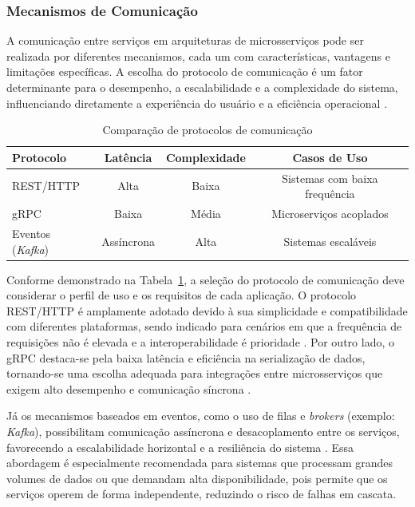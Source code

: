 \subsubsection{Mecanismos de Comunicação}
A comunicação entre serviços em arquiteturas de microsserviços pode ser realizada por diferentes mecanismos, cada um com características, vantagens e limitações específicas. A escolha do protocolo de comunicação é um fator determinante para o desempenho, a escalabilidade e a complexidade do sistema, influenciando diretamente a experiência do usuário e a eficiência operacional \cite{niswar2023performance, maso2024comparativo}.

\setcounter{table}{0}
\begin{table}[H]
\centering
\caption{Comparação de protocolos de comunicação}
\begin{tabular}{|l|c|c|c|}
\hline
Protocolo & Latência & Complexidade & Casos de Uso \\
\hline
REST/HTTP & Alta & Baixa & Sistemas com baixa frequência \\
gRPC & Baixa & Média & Microserviços acoplados \\
Eventos (\textit{Kafka}) & Assíncrona & Alta & Sistemas escaláveis \\
\hline
\end{tabular}
\label{tab:protocolos}
\end{table}

Conforme demonstrado na Tabela~\ref{tab:protocolos}, a seleção do protocolo de comunicação deve considerar o perfil de uso e os requisitos de cada aplicação. O protocolo REST/HTTP é amplamente adotado devido à sua simplicidade e compatibilidade com diferentes plataformas, sendo indicado para cenários em que a frequência de requisições não é elevada e a interoperabilidade é prioridade \cite{fielding2000rest, aws:1}. Por outro lado, o gRPC destaca-se pela baixa latência e eficiência na serialização de dados, tornando-se uma escolha adequada para integrações entre microsserviços que exigem alto desempenho e comunicação síncrona \cite{niswar2023performance, ibm:7}.

Já os mecanismos baseados em eventos, como o uso de filas e \textit{brokers} (exemplo: \textit{Kafka}), possibilitam comunicação assíncrona e desacoplamento entre os serviços, favorecendo a escalabilidade horizontal e a resiliência do sistema \cite{jamshidi2016systematic, shekhar2023microservices}. Essa abordagem é especialmente recomendada para sistemas que processam grandes volumes de dados ou que demandam alta disponibilidade, pois permite que os serviços operem de forma independente, reduzindo o risco de falhas em cascata.

